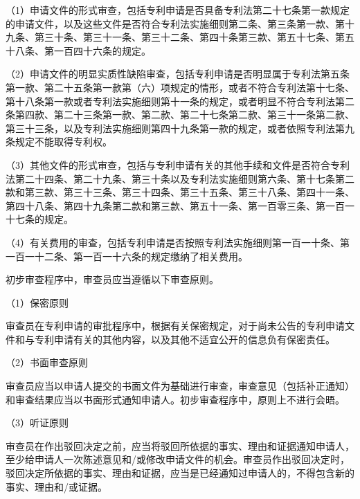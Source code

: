 
{\setlength{\parindent}{17.1bp}（1）申请文件的形式审查，包括专利申请是否具备专利法第二十七条第一款规定的申请文件，以及这些文件是否符合专利法实施细则第二条、第三条第一款、第十九条、第三十条、第三十一条、第三十二条、第四十条第三款、第五十七条、第五十八条、第一百四十六条的规定。\par}

{\setlength{\parindent}{17.1bp}（2）申请文件的明显实质性缺陷审查，包括专利申请是否明显属于专利法第五条第一款、第二十五条第一款第（六）项规定的情形，或者不符合专利法第十七条、第十八条第一款或者专利法实施细则第十一条的规定，或者明显不符合专利法第二条第四款、第二十三条第一款、第二款、第二十七条第二款、第三十一条第二款、第三十三条，以及专利法实施细则第四十九条第一款的规定，或者依照专利法第九条规定不能取得专利权。\par}

{\setlength{\parindent}{17.1bp}（3）其他文件的形式审查，包括与专利申请有关的其他手续和文件是否符合专利法第二十四条、第二十九条、第三十条以及专利法实施细则第六条、第十七条第二款和第三款、第三十三条、第三十四条、第三十五条、第三十八条、第四十一条、第四十八条、第四十九条第二款和第三款、第五十一条、第一百零三条、第一百一十七条的规定。\par}

{\setlength{\parindent}{17.1bp}（4）有关费用的审查，包括专利申请是否按照专利法实施细则第一百一十条、第一百一十二条、第一百一十六条的规定缴纳了相关费用。\par}

初步审查程序中，审查员应当遵循以下审查原则。

{\setlength{\parindent}{17.1bp}（1）保密原则\par}

审查员在专利申请的审批程序中，根据有关保密规定，对于尚未公告的专利申请文件和与专利申请有关的其他内容，以及其他不适宜公开的信息负有保密责任。

{\setlength{\parindent}{17.1bp}（2）书面审查原则\par}

审查员应当以申请人提交的书面文件为基础进行审查，审查意见（包括补正通知）和审查结果应当以书面形式通知申请人。初步审查程序中，原则上不进行会晤。

{\setlength{\parindent}{17.1bp}（3）听证原则\par}

审查员在作出驳回决定之前，应当将驳回所依据的事实、理由和证据通知申请人，至少给申请人一次陈述意见和/或修改申请文件的机会。审查员作出驳回决定时，驳回决定所依据的事实、理由和证据，应当是已经通知过申请人的，不得包含新的事实、理由和/或证据。

